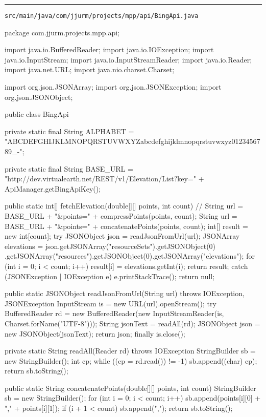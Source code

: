 \noindent\rule{\textwidth}{0.4pt}

\nointerlineskip
\texttt{src/main/java/com/jjurm/projects/mpp/api/BingApi.java}

\begin{javacode}
package com.jjurm.projects.mpp.api;

import java.io.BufferedReader;
import java.io.IOException;
import java.io.InputStream;
import java.io.InputStreamReader;
import java.io.Reader;
import java.net.URL;
import java.nio.charset.Charset;

import org.json.JSONArray;
import org.json.JSONException;
import org.json.JSONObject;

public class BingApi {

  private static final String ALPHABET =
      "ABCDEFGHIJKLMNOPQRSTUVWXYZabcdefghijklmnopqrstuvwxyz0123456789_-";

  private static final String BASE_URL =
      "http://dev.virtualearth.net/REST/v1/Elevation/List?key=" + ApiManager.getBingApiKey();

  public static int[] fetchElevation(double[][] points, int count) {
    // String url = BASE_URL + "&points=" + compressPoints(points, count);
    String url = BASE_URL + "&points=" + concatenatePoints(points, count);
    int[] result = new int[count];
    try {
      JSONObject json = readJsonFromUrl(url);
      JSONArray elevations = json.getJSONArray("resourceSets").getJSONObject(0)
          .getJSONArray("resources").getJSONObject(0).getJSONArray("elevations");
      for (int i = 0; i < count; i++) {
        result[i] = elevations.getInt(i);
      }
      return result;
    } catch (JSONException | IOException e) {
      e.printStackTrace();
    }
    return null;
  }

  public static JSONObject readJsonFromUrl(String url) throws IOException, JSONException {
    InputStream is = new URL(url).openStream();
    try {
      BufferedReader rd = new BufferedReader(new InputStreamReader(is, Charset.forName("UTF-8")));
      String jsonText = readAll(rd);
      JSONObject json = new JSONObject(jsonText);
      return json;
    } finally {
      is.close();
    }
  }

  private static String readAll(Reader rd) throws IOException {
    StringBuilder sb = new StringBuilder();
    int cp;
    while ((cp = rd.read()) != -1) {
      sb.append((char) cp);
    }
    return sb.toString();
  }

  public static String concatenatePoints(double[][] points, int count) {
    StringBuilder sb = new StringBuilder();
    for (int i = 0; i < count; i++) {
      sb.append(points[i][0] + "," + points[i][1]);
      if (i + 1 < count) {
        sb.append(",");
      }
    }
    return sb.toString();
  }

}
\end{javacode}
